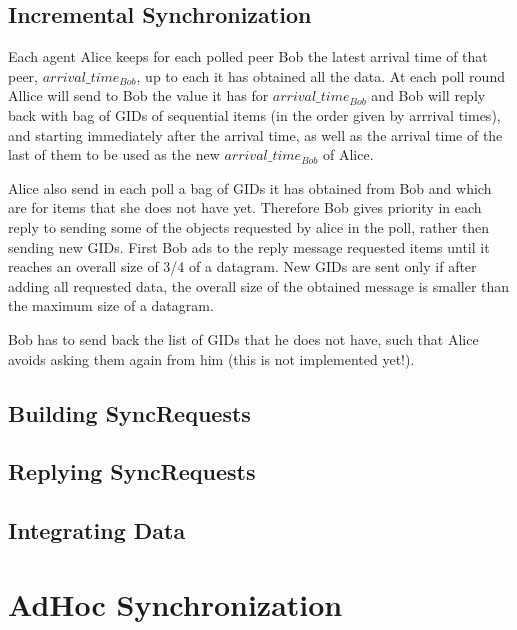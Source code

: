 \documentclass{book}
\begin{document}
\section{Incremental Synchronization}

Each agent Alice keeps for each polled peer Bob the latest arrival time of that peer, $arrival\_time_{Bob}$, up to each it has obtained all the data.
At each poll round Allice will send to Bob the value it has for $arrival\_time_{Bob}$ and Bob will reply
back with bag of GIDs of sequential items (in the order given by arrrival times), and starting immediately after the arrival time,
as well as the arrival time of the last of them to be used as the new $arrival\_time_{Bob}$ of Alice.

Alice also send in each poll a bag of GIDs it has obtained from Bob and which are for items that she does not have yet.
Therefore Bob gives priority in each reply to sending some of the objects requested by alice in the poll, rather then 
sending new GIDs. First Bob ads to the reply message requested items until it reaches an overall size
of 3/4 of a datagram. 
New GIDs are sent only if after adding all requested data, the overall size of the obtained message is smaller than the maximum size of a datagram.

Bob has to send back the list of GIDs that he does not have, such that Alice avoids asking them again from him (this is not implemented yet!).

\section{Building SyncRequests}

\section{Replying SyncRequests}

\section{Integrating Data}

\chapter{AdHoc Synchronization}
\end{document}
